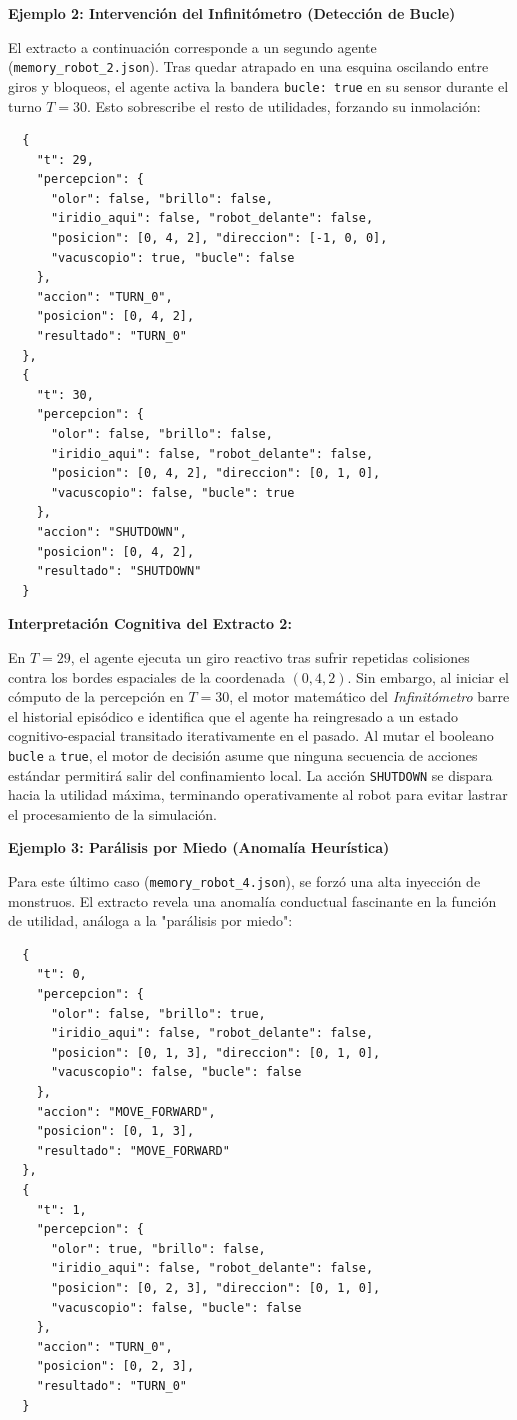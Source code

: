 \documentclass[conference]{IEEEtran}
\begin{document}
\vspace{0.3cm}
\textbf{Ejemplo 2: Intervención del Infinitómetro (Detección de Bucle)}

El extracto a continuación corresponde a un segundo agente (\texttt{memory\_robot\_2.json}). Tras quedar atrapado en una esquina oscilando entre giros y bloqueos, el agente activa la bandera \texttt{bucle: true} en su sensor durante el turno $T=30$. Esto sobrescribe el resto de utilidades, forzando su inmolación:

{\scriptsize
\begin{verbatim}
  {
    "t": 29,
    "percepcion": {
      "olor": false, "brillo": false,
      "iridio_aqui": false, "robot_delante": false,
      "posicion": [0, 4, 2], "direccion": [-1, 0, 0],
      "vacuscopio": true, "bucle": false
    },
    "accion": "TURN_0",
    "posicion": [0, 4, 2],
    "resultado": "TURN_0"
  },
  {
    "t": 30,
    "percepcion": {
      "olor": false, "brillo": false,
      "iridio_aqui": false, "robot_delante": false,
      "posicion": [0, 4, 2], "direccion": [0, 1, 0],
      "vacuscopio": false, "bucle": true
    },
    "accion": "SHUTDOWN",
    "posicion": [0, 4, 2],
    "resultado": "SHUTDOWN"
  }
\end{verbatim}
}

\textbf{Interpretación Cognitiva del Extracto 2:}

En $T=29$, el agente ejecuta un giro reactivo tras sufrir repetidas colisiones contra los bordes espaciales de la coordenada $(0,4,2)$. Sin embargo, al iniciar el cómputo de la percepción en $T=30$, el motor matemático del \textit{Infinitómetro} barre el historial episódico e identifica que el agente ha reingresado a un estado cognitivo-espacial transitado iterativamente en el pasado. Al mutar el booleano \texttt{bucle} a \texttt{true}, el motor de decisión asume que ninguna secuencia de acciones estándar permitirá salir del confinamiento local. La acción \texttt{SHUTDOWN} se dispara hacia la utilidad máxima, terminando operativamente al robot para evitar lastrar el procesamiento de la simulación.

\vspace{0.3cm}
\textbf{Ejemplo 3: Parálisis por Miedo (Anomalía Heurística)}

Para este último caso (\texttt{memory\_robot\_4.json}), se forzó una alta inyección de monstruos. El extracto revela una anomalía conductual fascinante en la función de utilidad, análoga a la "parálisis por miedo":

{\scriptsize
\begin{verbatim}
  {
    "t": 0,
    "percepcion": {
      "olor": false, "brillo": true,
      "iridio_aqui": false, "robot_delante": false,
      "posicion": [0, 1, 3], "direccion": [0, 1, 0],
      "vacuscopio": false, "bucle": false
    },
    "accion": "MOVE_FORWARD",
    "posicion": [0, 1, 3],
    "resultado": "MOVE_FORWARD"
  },
  {
    "t": 1,
    "percepcion": {
      "olor": true, "brillo": false,
      "iridio_aqui": false, "robot_delante": false,
      "posicion": [0, 2, 3], "direccion": [0, 1, 0],
      "vacuscopio": false, "bucle": false
    },
    "accion": "TURN_0",
    "posicion": [0, 2, 3],
    "resultado": "TURN_0"
  }
\end{verbatim}
}
\end{document}
